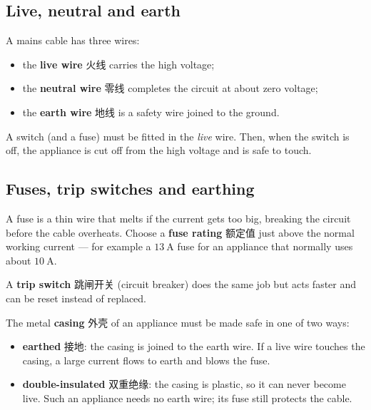 \documentclass[11pt]{article}
\begin{document}
\subsection*{Live, neutral and earth}

A mains cable has three wires:

\begin{itemize}
\item the \textbf{live wire} 火线 carries the high voltage;

\item the \textbf{neutral wire} 零线 completes the circuit at about zero voltage;

\item the \textbf{earth wire} 地线 is a safety wire joined to the ground.

\end{itemize}

A switch (and a fuse) must be fitted in the \emph{live} wire. Then, when the switch is off, the appliance is cut off from the high voltage and is safe to touch.

\subsection*{Fuses, trip switches and earthing}

A fuse is a thin wire that melts if the current gets too big, breaking the circuit before the cable overheats. Choose a \textbf{fuse rating} 额定值 just above the normal working current — for example a $13\ \text{A}$ fuse for an appliance that normally uses about $10\ \text{A}$.

A \textbf{trip switch} 跳闸开关 (circuit breaker) does the same job but acts faster and can be reset instead of replaced.

The metal \textbf{casing} 外壳 of an appliance must be made safe in one of two ways:

\begin{itemize}
\item \textbf{earthed} 接地: the casing is joined to the earth wire. If a live wire touches the casing, a large current flows to earth and blows the fuse.

\item \textbf{double-insulated} 双重绝缘: the casing is plastic, so it can never become live. Such an appliance needs no earth wire; its fuse still protects the cable.

\end{itemize}
\end{document}
